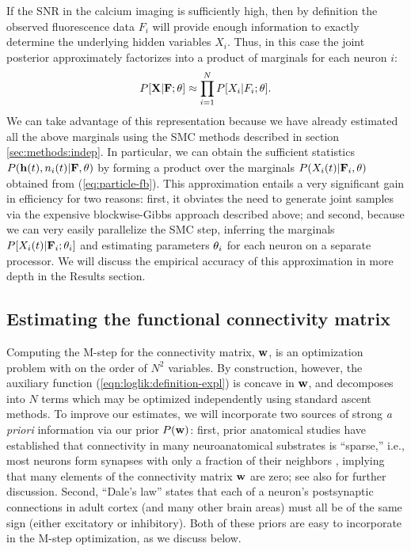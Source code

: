 If the SNR in the calcium imaging is sufficiently high, then by
definition the observed fluorescence data $F_i$ will provide enough
information to exactly determine the underlying hidden variables
$X_i$.  Thus, in this case the joint posterior approximately
factorizes into a product of marginals for each neuron $i$:
\begin{equation} \label{eqn:indep_approx}
  P[{\bf X}|{\bf F};\theta] \approx \prod_{i=1}^N P[X_i|F_i; \bth].
\end{equation}
We can take advantage of this representation because we have already
estimated all the above marginals using the SMC methods described in
section \ref{sec:methods:indep}.  In particular, we can obtain the
sufficient statistics $P(\mathbf{h}(t),n_i(t) | {\bf F},\theta)$ by forming a
product over the marginals $P(X_i(t) | {\bf F}_i,\theta)$ obtained from
(\ref{eq:particle-fb}).  This approximation entails a very significant
gain in efficiency for two reasons: first, it obviates the need to
generate joint samples via the expensive blockwise-Gibbs approach
described above; and second, because we can very easily parallelize
the SMC step, inferring the marginals $P[X_i(t) | {\bf F}_i; \mathbf{\theta}_i]$ and
estimating parameters $\mathbf{\theta}_i$ for each neuron on a separate
processor.  We will discuss the empirical accuracy of this
approximation in more depth in the Results section.


\subsection{Estimating the functional connectivity matrix} \label{sec:methods:parameters HMM}

Computing the M-step for the connectivity matrix, $\mathbf{w}$, is an
optimization problem with on the order of $N^2$ variables.  By
construction, however, the auxiliary function
(\ref{eqn:loglik:definition-expl}) is concave in $\mathbf{w}$, and decomposes
into $N$ terms which may be optimized independently using standard
ascent methods.  To improve our estimates, we will incorporate two
sources of strong \emph{a priori} information via our prior $P(\mathbf{w})$:
first, prior anatomical studies have established that connectivity in
many neuroanatomical substrates is ``sparse,'' i.e., most neurons form
synapses with only a fraction of their neighbors
\cite{Buhl94,Thompson88,Reyes98,Feldmeyer99,Gupta00,FeldmeyerSakmann00,PetersenSakmann00,Binzegger04,Song2005,Mishchenko2009b},
implying that many elements of the connectivity matrix $\mathbf{w}$ are zero;
see also \cite{PAN04c,Rigat06,PILL07,Stevenson08} for further
discussion.  Second, ``Dale's law'' states that each of a neuron's
postsynaptic connections in adult cortex (and many other brain areas)
must all be of the same sign (either excitatory or inhibitory).  Both
of these priors are easy to incorporate in the M-step optimization, as
we discuss below.


